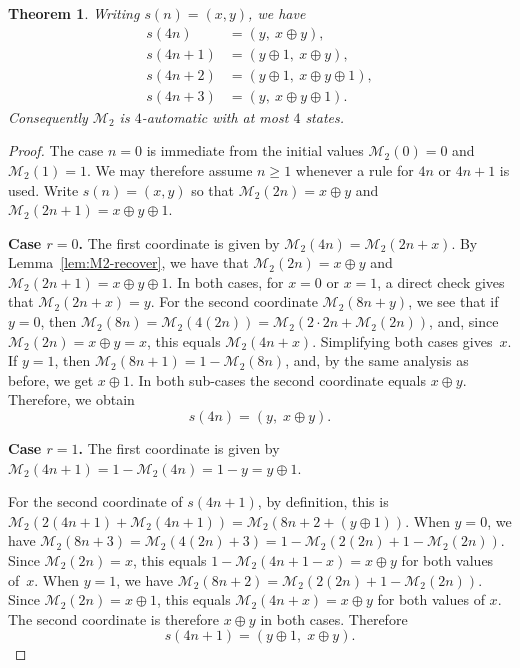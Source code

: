 \documentclass[10pt,a4paper]{amsart}
\newtheorem{theorem}{Theorem}
\begin{document}
\begin{theorem}\label{thm:M2-affine} 
Writing $s(n)=(x,y)$, we have
\begin{align*}
 s(4n) &= (y,\ x\oplus y),\\
 s(4n+1) &= (y\oplus 1,\ x\oplus y),\\
 s(4n+2) &= (y\oplus 1,\ x\oplus y\oplus 1),\\
 s(4n+3) &= (y,\ x\oplus y\oplus 1).
\end{align*}
Consequently $\mathcal{M}_{2}$ is $4$-automatic with at most $4$ states.
\end{theorem}

\begin{proof}
 The case $n=0$ is immediate from the initial values $\mathcal{M}_{2}(0)=0$
 and $\mathcal{M}_{2}(1)=1$. We may therefore assume $n\ge 1$ whenever a rule for $4n$ or
 $4n+1$ is used.
 Write $s(n) = (x,y)$ so that $\mathcal{M}_{2}(2n) = x \oplus y$ and $\mathcal{M}_{2}(2n+1) = x \oplus y \oplus 1$.

\textbf{Case $r = 0$.}
 The first coordinate is given by $\mathcal{M}_{2}(4n) = \mathcal{M}_{2}(2n + x)$. By Lemma~\ref{lem:M2-recover}, we have that
 $\mathcal{M}_{2}(2n) = x \oplus y$ and $\mathcal{M}_{2}(2n+1) = x \oplus y \oplus 1$. In both cases, for $x = 0$ or $x = 1$, a direct 
 check gives that $\mathcal{M}_{2}(2n + x) = y$. For the second coordinate $\mathcal{M}_{2}(8n + y)$, we see that if $y = 0$, then 
 $\mathcal{M}_{2}(8n) = \mathcal{M}_{2}(4(2n)) = \mathcal{M}_{2}(2 \cdot 2n + \mathcal{M}_{2}(2n))$, and, since $\mathcal{M}_{2}(2n) = x 
 \oplus y = x$, this equals $\mathcal{M}_{2}(4n + x)$. Simplifying both cases gives~$x$. If $y = 1$, then $\mathcal{M}_{2}(8n+1) = 1 
 - \mathcal{M}_{2}(8n)$, and, by the same analysis as before, we get $x \oplus 1$. In both sub-cases the second coordinate equals 
 $x \oplus y$. Therefore, we obtain 
$$ s(4n) = (y,\; x \oplus y). $$

\textbf{Case $r = 1$.} The first coordinate is given by $\mathcal{M}_{2}(4n+1) = 1 - \mathcal{M}_{2}(4n) = 1 - y = y \oplus 1$.

 For the second coordinate of $s(4n+1)$, by definition, this is $\mathcal{M}_{2}(2(4n+1) + \mathcal{M}_{2}(4n+1)) = 
 \mathcal{M}_{2}(8n + 2 + (y \oplus 1))$. When $y = 0$, we have $\mathcal{M}_{2}(8n+3) = \mathcal{M}_{2}(4(2n)+3) = 1 - 
 \mathcal{M}_{2}(2(2n)+1-\mathcal{M}_{2}(2n))$. Since $\mathcal{M}_{2}(2n) = x$, this equals $1 - \mathcal{M}_{2}(4 n + 1 - 
 x) = x \oplus y$ for both values of~$x$. When $y = 1$, we have $\mathcal{M}_{2}(8n+2) = \mathcal{M}_{2}(2(2n) + 1 - 
 \mathcal{M}_{2}(2n))$. Since $\mathcal{M}_{2}(2n) = x \oplus 1$, this equals $\mathcal{M}_{2}(4n+x) = x \oplus y$ for both values of 
 $x$. The second coordinate is therefore $x \oplus y$ in both cases. Therefore
\[
 s(4n+1) = (y \oplus 1,\; x \oplus y).
\]


\end{proof}
\end{document}
